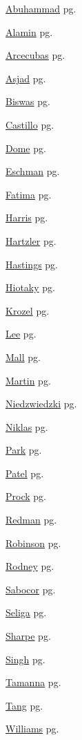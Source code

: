\item \hyperlink{Abuhammad.1}{Abuhammad} pg. \pageref{abs:Abuhammad}
\item \hyperlink{Alamin.1}{Alamin} pg. \pageref{abs:Alamin}
\item \hyperlink{Arcecubas.1}{Arcecubas} pg. \pageref{abs:Arcecubas}
\item \hyperlink{Asjad.1}{Asjad} pg. \pageref{abs:Asjad}
\item \hyperlink{Biswas.1}{Biswas} pg. \pageref{abs:Biswas}
\item \hyperlink{Castillo.1}{Castillo} pg. \pageref{abs:Castillo}
\item \hyperlink{Dome.1}{Dome} pg. \pageref{abs:Dome}
\item \hyperlink{Eschman.1}{Eschman} pg. \pageref{abs:Eschman}
\item \hyperlink{Fatima.1}{Fatima} pg. \pageref{abs:Fatima}
\item \hyperlink{Harris.1}{Harris} pg. \pageref{abs:Harris}
\item \hyperlink{Hartzler.1}{Hartzler} pg. \pageref{abs:Hartzler}
\item \hyperlink{Hastings.1}{Hastings} pg. \pageref{abs:Hastings}
\item \hyperlink{Hiotaky.1}{Hiotaky} pg. \pageref{abs:Hiotaky}
\item \hyperlink{Krozel.1}{Krozel} pg. \pageref{abs:Krozel}
\item \hyperlink{Lee.1}{Lee} pg. \pageref{abs:Lee}
\item \hyperlink{Mall.1}{Mall} pg. \pageref{abs:Mall}
\item \hyperlink{Martin.1}{Martin} pg. \pageref{abs:Martin}
\item \hyperlink{Niedzwiedzki.1}{Niedzwiedzki} pg. \pageref{abs:Niedzwiedzki}
\item \hyperlink{Niklas.1}{Niklas} pg. \pageref{abs:Niklas}
\item \hyperlink{Park.1}{Park} pg. \pageref{abs:Park}
\item \hyperlink{Patel.1}{Patel} pg. \pageref{abs:Patel}
\item \hyperlink{Prock.1}{Prock} pg. \pageref{abs:Prock}
\item \hyperlink{Redman.1}{Redman} pg. \pageref{abs:Redman}
\item \hyperlink{Robinson.1}{Robinson} pg. \pageref{abs:Robinson}
\item \hyperlink{Rodney.1}{Rodney} pg. \pageref{abs:Rodney}
\item \hyperlink{Sabocor.1}{Sabocor} pg. \pageref{abs:Sabocor}
\item \hyperlink{Seliga.1}{Seliga} pg. \pageref{abs:Seliga}
\item \hyperlink{Sharpe.1}{Sharpe} pg. \pageref{abs:Sharpe}
\item \hyperlink{Singh.1}{Singh} pg. \pageref{abs:Singh}
\item \hyperlink{Tamanna.1}{Tamanna} pg. \pageref{abs:Tamanna}
\item \hyperlink{Tang.1}{Tang} pg. \pageref{abs:Tang}
\item \hyperlink{Williams.1}{Williams} pg. \pageref{abs:Williams}
